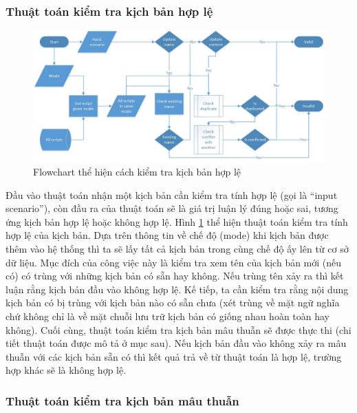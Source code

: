 \documentclass[12pt,a4paper,oneside]{extbook}
\begin{document}
\subsubsection{Thuật toán kiểm tra kịch bản hợp lệ}

\begin{figure}[h]
  \centering
     \includegraphics[width=15cm]{6-Flowchart-Scenario-Validator-Check-valid-scenario}
  \caption{Flowchart thể hiện cách kiểm tra kịch bản hợp lệ}\label{fig:6-Flowchart-Scenario-Validator-Check-valid-scenario}
\end{figure}

\noindent
Đầu vào thuật toán nhận một kịch bản cần kiểm tra tính hợp lệ (gọi là “input scenario”), còn đầu ra của thuật toán sẽ là giá trị luận lý đúng hoặc sai, tương ứng kịch bản hợp lệ hoặc không hợp lệ. Hình \ref{fig:6-Flowchart-Scenario-Validator-Check-valid-scenario} thể hiện thuật toán kiểm tra tính hợp lệ của kịch bản. Dựa trên thông tin về chế độ (mode) khi kịch bản được thêm vào hệ thống thì ta sẽ lấy tất cả kịch bản trong cùng chế độ ấy lên từ cơ sở dữ liệu. Mục đích của công việc này là kiểm tra xem tên của kịch bản mới (nếu có) có trùng với những kịch bản có sẵn hay không. Nếu trùng tên xảy ra thì kết luận rằng kịch bản đầu vào không hợp lệ. Kế tiếp, ta cần kiểm tra rằng nội dung kịch bản có bị trùng với kịch bản nào có sẵn chưa (xét trùng về mặt ngữ nghĩa chứ không chỉ là về mặt chuỗi lưu trữ kịch bản có giống nhau hoàn toàn hay không). Cuối cùng, thuật toán kiểm tra kịch bản mâu thuẫn sẽ được thực thi (chi tiết thuật toán được mô tả ở mục sau). Nếu kịch bản đầu vào không xảy ra mâu thuẫn với các kịch bản sẵn có thì kết quả trả về từ thuật toán là hợp lệ, trường hợp khác sẽ là không hợp lệ.

\subsubsection{Thuật toán kiểm tra kịch bản mâu thuẫn}
\end{document}
